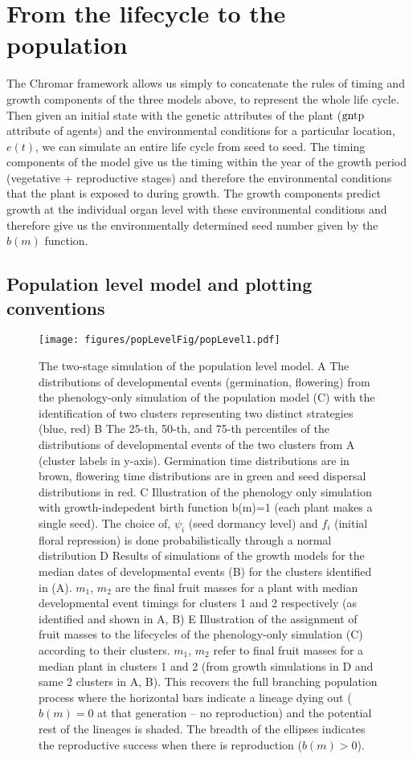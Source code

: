 \section{From the lifecycle to the population}
\label{sec:pop}
The Chromar framework allows us simply to concatenate the rules of
timing and growth components of the three models above, to represent the
whole life cycle. Then given an initial state with the genetic
attributes of the plant (\(\mathrm{gntp}\) attribute of agents) and the
environmental conditions for a particular location, \(e(t)\), we can
simulate an entire life cycle from seed to seed. The timing components
of the model give us the timing within the year of the growth period
(vegetative + reproductive stages) and therefore the environmental
conditions that the plant is exposed to during growth. The growth
components predict growth at the individual organ level with these
environmental conditions and therefore give us the environmentally
determined seed number given by the \(b(m)\) function.


\subsection{Population level model and plotting conventions}
\label{population-level-model-and-plotting-conventions}

\begin{figure}[p]
\centering
\texttt{[image: figures/popLevelFig/popLevel1.pdf]}
\caption{The two-stage simulation of the population level model. A The
  distributions of developmental events (germination, flowering) from the
  phenology-only simulation of the population model (C) with the identification
  of two clusters representing two distinct strategies (blue, red) B The 25-th,
  50-th, and 75-th percentiles of the distributions of developmental events of
  the two clusters from A (cluster labels in y-axis). Germination time
  distributions are in brown, flowering time distributions are in green and seed
  dispersal distributions in red. C Illustration of the phenology only simulation
  with growth-indepedent birth function b(m)=1 (each plant makes a single
  seed). The choice of, $\psi_i$ (seed dormancy level) and $f_i$ (initial floral
  repression) is done probabilistically through a normal distribution D Results
  of simulations of the growth models for the median dates of developmental
  events (B) for the clusters identified in (A). $m_1$, $m_2$ are the final
  fruit masses for a plant with median developmental event timings for clusters
  1 and 2 respectively (as identified and shown in A, B) E Illustration of the
  assignment of fruit masses to the lifecycles of the phenology-only simulation
  (C) according to their clusters. $m_1$, $m_2$ refer to final fruit masses for
  a median plant in clusters 1 and 2 (from growth simulations in D and same 2
  clusters in A, B). This recovers the full branching population process where
  the horizontal bars indicate a lineage dying out ($b(m)=0$ at that generation
  -- no reproduction) and the potential rest of the lineages is shaded. The
  breadth of the ellipses indicates the reproductive success when there is
  reproduction ($b(m) > 0$).}
\label{fig:popModel}
\end{figure}

